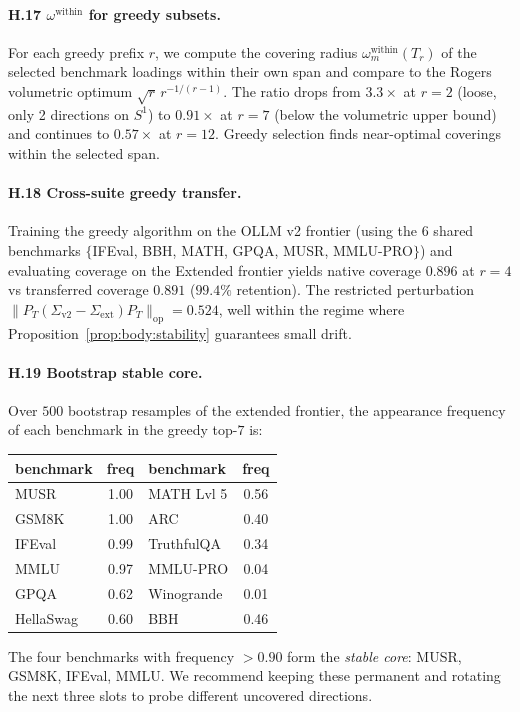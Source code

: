 \documentclass{article}
\begin{document}
\paragraph{H.17 $\omega^{\mathrm{within}}$ for greedy subsets.}
For each greedy prefix $r$, we compute the covering radius
$\omega_m^{\mathrm{within}}(T_r)$ of the selected benchmark loadings
within their own span and compare to the Rogers volumetric optimum
$\sqrt{r}\,r^{-1/(r-1)}$. The ratio drops from $3.3\times$ at $r = 2$
(loose, only 2 directions on $S^1$) to $0.91\times$ at $r = 7$
(below the volumetric upper bound) and continues to $0.57\times$ at
$r = 12$. Greedy selection finds near-optimal coverings within the
selected span.

\paragraph{H.18 Cross-suite greedy transfer.}
Training the greedy algorithm on the OLLM v2 frontier (using the $6$
shared benchmarks $\{$IFEval, BBH, MATH, GPQA, MUSR, MMLU-PRO$\}$)
and evaluating coverage on the Extended frontier yields native
coverage $0.896$ at $r = 4$ vs transferred coverage $0.891$
($99.4\%$ retention). The restricted perturbation
$\|P_T(\Sigma_{\mathrm{v2}} - \Sigma_{\mathrm{ext}})P_T\|_{\mathrm{op}}
= 0.524$, well within the regime where
Proposition~\ref{prop:body:stability} guarantees small drift.

\paragraph{H.19 Bootstrap stable core.}
Over $500$ bootstrap resamples of the extended frontier, the
appearance frequency of each benchmark in the greedy top-$7$ is:
\begin{center}\small
\begin{tabular}{lc|lc}
\toprule
benchmark & freq & benchmark & freq \\
\midrule
MUSR        & 1.00 & MATH Lvl 5 & 0.56 \\
GSM8K       & 1.00 & ARC        & 0.40 \\
IFEval      & 0.99 & TruthfulQA & 0.34 \\
MMLU        & 0.97 & MMLU-PRO   & 0.04 \\
GPQA        & 0.62 & Winogrande & 0.01 \\
HellaSwag   & 0.60 & BBH        & 0.46 \\
\bottomrule
\end{tabular}
\end{center}
The four benchmarks with frequency $> 0.90$ form the \emph{stable
core}: MUSR, GSM8K, IFEval, MMLU. We recommend keeping these
permanent and rotating the next three slots to probe different
uncovered directions.
\end{document}
